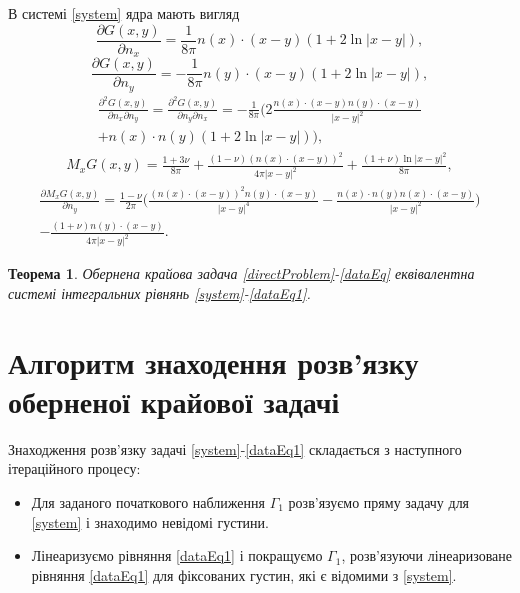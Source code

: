 \documentclass[12pt]{report}
\newtheorem{theorem}{Теорема}
\begin{document}
В системі \eqref{system} ядра мають вигляд
\begin{equation*}
 	\frac{\partial G(x,y)}{\partial n_x}=\frac{1}{8\pi}n(x)\cdot(x-y)(1+2\ln|x-y|),
 \end{equation*}
 \begin{equation*}
 	\frac{\partial G(x,y)}{\partial n_y}=-\frac{1}{8\pi}n(y)\cdot(x-y)(1+2\ln|x-y|),
 \end{equation*}
 \begin{gather*}
 	\frac{\partial^2 G(x,y)}{\partial n_x\partial n_y}=\frac{\partial^2 G(x,y)}{\partial n_y\partial n_x}=-\frac{1}{8\pi}\bigg(2\frac{n(x)\cdot(x-y)n(y)\cdot(x-y)}{|x-y|^2} \\
	+n(x)\cdot n(y)(1+2\ln|x-y|)\bigg),
 \end{gather*}
 \begin{gather*}
 	M_x G(x,y)=\frac{1+3\nu}{8\pi}+\frac{(1-\nu)(n(x)\cdot(x-y))^2}{4\pi|x-y|^2}+\frac{(1+\nu)\ln|x-y|^2}{8\pi},
 \end{gather*}
 \begin{gather*}
 	\frac{\partial M_x G(x,y)}{\partial n_y}=\frac{1-\nu}{2\pi}\Big(\frac{(n(x)\cdot(x-y))^2n(y)\cdot(x-y)}{|x-y|^4}-\frac{n(x)\cdot n(y)n(x)\cdot(x-y)}{|x-y|^2} \Big) \\
	-\frac{(1+\nu)n(y)\cdot(x-y)}{4\pi|x-y|^2}.
 \end{gather*}


\begin{theorem}
Обернена крайова задача \eqref{directProblem}-\eqref{dataEq} еквівалентна системі інтегральних рівнянь \eqref{system}-\eqref{dataEq1}.
\end{theorem}

\section{Алгоритм знаходення розв'язку оберненої крайової задачі}

Знаходження розв'язку задачі \eqref{system}-\eqref{dataEq1} складається з наступного ітераційного процесу:
\begin{itemize}
  \item Для заданого початкового наближення $\Gamma_1$ розв'язуємо пряму задачу для \eqref{system} і знаходимо невідомі густини.
  \item Лінеаризуємо рівняння \eqref{dataEq1} і покращуємо $\Gamma_1$, розв'язуючи лінеаризоване рівняння \eqref{dataEq1} для фіксованих густин, які є відомими з \eqref{system}.
\end{itemize}
\end{document}

